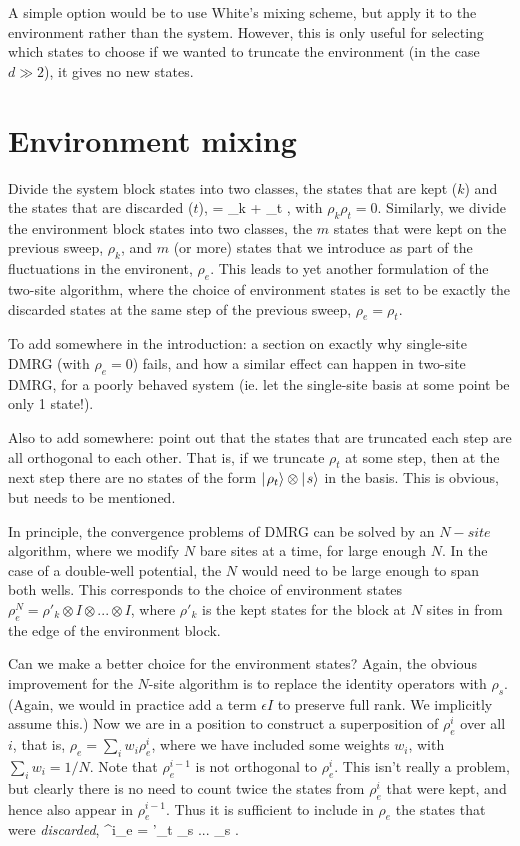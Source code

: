 \documentclass{article}[10pt]
\begin{document}
A simple option would be to use White's mixing scheme, but apply it to the environment rather than
the system. However, this is only useful for selecting which states to choose if we wanted
to truncate the environment (in the case $d \gg 2$), it gives no new states.

\section{Environment mixing}
Divide the system block states into two classes, the states that are kept ($k$) and the 
states that are discarded ($t$),
\beq
\rho = \rho_k + \rho_t \; ,
\eeq
with $\rho_k \rho_t = 0$. 
Similarly, we divide the environment block states into two classes, the $m$ states
that were kept on the previous sweep, $\rho_k$, and $m$ (or more) states that we introduce 
as part of
the fluctuations in the environent, $\rho_e$.  This leads to yet another formulation of the two-site
algorithm, where the choice of environment states is set to be exactly the discarded states at
the same step of the previous sweep, $\rho_e = \rho_t$.

To add somewhere in the introduction: a section on exactly why single-site DMRG 
(with $\rho_e = 0$) fails, and how
a similar effect can happen in two-site DMRG, for a poorly behaved system (ie. let
the single-site basis at some point be only 1 state!).

Also to add somewhere: point out that the states that are truncated each step
are all orthogonal to each other. That is, if we truncate $\rho_t$ at some step,
then at the next step there are no states of the form $\hbox{$\mid \! {\rho_t} \rangle$} \otimes \hbox{$\mid \! {s} \rangle$}$ in
the basis. This is obvious, but needs to be mentioned.

In principle, the convergence problems of DMRG can be solved by an $N-site$ algorithm,
where we modify $N$ bare sites at a time, for large enough $N$. In the case of a double-well
potential, the $N$ would need to be large enough to span both wells.
This corresponds to the choice of environment states 
$\rho^N_e = \rho'_k \otimes I \otimes ... \otimes I$, where $\rho'_k$ is the kept states
for the block at $N$ sites in from the edge of the environment block.

Can we make a better choice for the environment states? Again, the obvious improvement
for the $N$-site algorithm is to replace the identity operators with $\rho_s$. (Again, we would
in practice add a term $\epsilon I$ to preserve full rank. We implicitly assume this.) 
Now we are in a position to construct a superposition of
$\rho^i_e$ over all $i$, that is, $\rho_e = \sum_i w_i \rho^i_e$,
where we have included some weights $w_i$, with $\sum_i w_i = 1/N$. 
Note that $\rho^{i-1}_e$ is not orthogonal to $\rho^{i}_e$. This isn't really a problem,
but clearly there is no need to count twice the states from $\rho^{i}_e$ that were kept,
and hence also appear in $\rho^{i-1}_e$. Thus it is sufficient to include in $\rho_e$ the
states that were \textit{discarded},
\beq
\rho^i_e = \rho'_t \otimes \rho_s \otimes ... \otimes \rho_s \; .
\label{eq:RhoE}
\eeq
\end{document}
